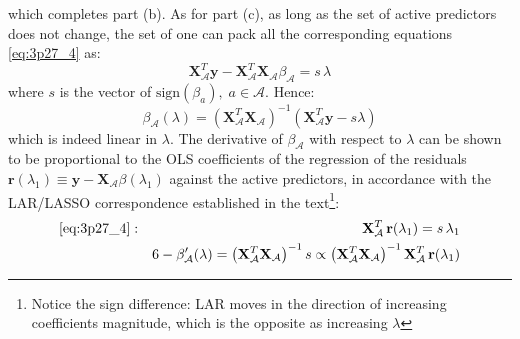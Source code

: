 which completes part (b). As for part (c), as long as the set of active predictors
does not change, the set of one can pack all the corresponding equations
\eqref{eq:3p27_4} as:
\begin{equation*}
\mathbf{X}_\mathcal{A}^T \mathbf{y} - \mathbf{X}_\mathcal{A}^T \mathbf{X}_\mathcal{A}
\beta_\mathcal{A} = s\, \lambda
\end{equation*}
where $s$ is the vector of $\textrm{sign}(\beta_a), \; a \in \mathcal{A}$. Hence:
\begin{equation*}
\beta_\mathcal{A}(\lambda) = \left(\mathbf{X}_\mathcal{A}^T \mathbf{X}_\mathcal{A}\right)^{-1} \left(\mathbf{X}_\mathcal{A}^T \mathbf{y} - s \lambda\right)
\end{equation*}
which is indeed linear in $\lambda$. The derivative of $\beta_\mathcal{A}$ with respect to $\lambda$ can be shown to be proportional to the OLS coefficients of the regression of the residuals $\mathbf{r}(\lambda_1) \equiv \mathbf{y} - \mathbf{X}_\mathcal{A} \beta(\lambda_1)$
against the active predictors, in accordance with the LAR/LASSO correspondence
established in the text\footnote{Notice the sign difference: LAR moves in the direction of increasing coefficients magnitude, which is the opposite as
    increasing $\lambda$}:
\begin{eqnarray*}
    \eqref{eq:3p27_4}: && \quad \mathbf{X}_\mathcal{A}^T\, \mathbf{r}(\lambda_1) = s\, \lambda_1 \\ &&6
    - \beta_\mathcal{A}'(\lambda) = \left(\mathbf{X}_\mathcal{A}^T \mathbf{X}_\mathcal{A}\right)^{-1} s \propto \left(\mathbf{X}_\mathcal{A}^T \mathbf{X}_\mathcal{A}\right)^{-1} \mathbf{X}_\mathcal{A}^T\, \mathbf{r}(\lambda_1)
    \end{eqnarray*}

